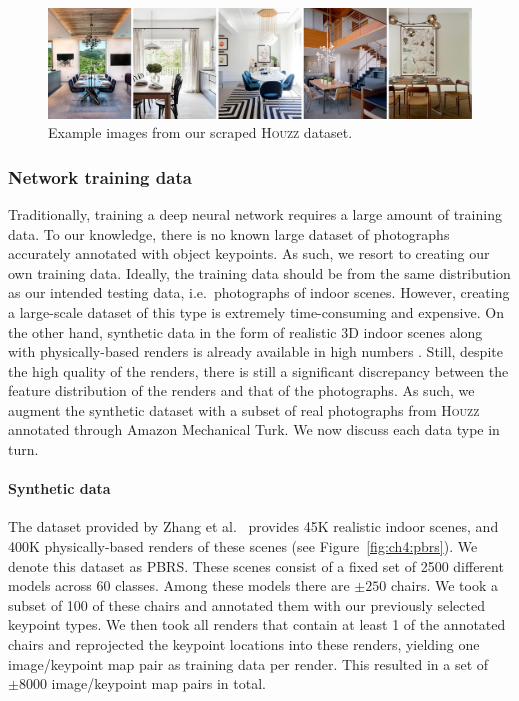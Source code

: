 \documentclass[10pt,twocolumn,letterpaper]{article}
\begin{document}
\begin{figure}
    \includegraphics[width=\linewidth]{figures/houzz_example/houzz_example}
    \caption[Houzz samples]{Example images from our scraped \textsc{Houzz} dataset.}
    \label{fig:ch4:houzz}
\end{figure}

\subsubsection{Network training data}
Traditionally, training a deep neural network requires a large amount of
training data.  To our knowledge, there is no known large dataset of
photographs accurately annotated with object keypoints. As such, we resort
to creating our own training data. Ideally, the training data should be
from the same distribution as our intended testing data, i.e.\ photographs
of indoor scenes. However, creating a large-scale dataset of this type
is extremely time-consuming and expensive. On the other hand, synthetic
data in the form of realistic 3D indoor scenes along with physically-based
renders is already available in high numbers \cite{Zhang:2017:CVPR}.
Still, despite the high quality of the renders, there is still a significant
discrepancy between the feature distribution of the renders and that of the
photographs. As such, we augment the synthetic dataset with a subset of real
photographs from \textsc{Houzz} annotated through Amazon Mechanical Turk. We
now discuss each data type in turn.

\paragraph{Synthetic data}
The dataset provided by Zhang et al.~\cite{Zhang:2017:CVPR} provides 45K realistic indoor
scenes, and 400K physically-based renders of these scenes (see Figure~\ref{fig:ch4:pbrs}). We denote this
dataset as \textsc{PBRS}. These scenes consist of a fixed set of 2500 different
models across 60 classes. Among these models there are $\pm250$ chairs. We took a
subset of 100 of these chairs and annotated them with our previously selected
keypoint types. We then took all renders that contain at least 1 of the
annotated chairs and reprojected the keypoint locations into these renders,
yielding one image/keypoint map pair as training data per render. This resulted
in a set of $\pm8000$ image/keypoint map pairs in total.
\end{document}
